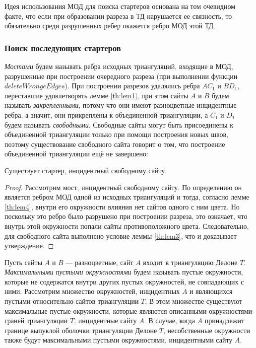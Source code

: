 \documentclass[12pt]{article}
\begin{document}
Идея использования МОД для поиска стартеров основана на том очевидном факте, что если при образовании разреза в ТД нарушается ее связность, то обязательно среди разрушенных ребер окажется ребро МОД этой ТД.

\subsubsection{Поиск последующих стартеров}
{\itshape Мостами} будем называть ребра исходных триангуляций,
входящие в МОД, разрушенные при построении очередного разреза (при выполнении функции $deleteWrongeEdges$).
При построении разрезов удалялись ребра $AC_1$ и $BD_1$, переставшие удовлетворять лемме \ref{th:lem1},
при этом сайты $A$ и $B$ будем называть {\it закрепленными}, потому что они имеют разноцветные инцидентные ребра, а значит, они прикреплены к объединенной триангуляции, а $C_1$ и $D_1$ будем называть {\it свободными}.
Свободные сайты могут быть присоединены к объединенной триангуляции только при помощи построения новых швов,
поэтому существование свободного сайта говорит о том, что построение объединенной триангуляции ещё не завершено:

\begin{lemma}
\label{th:lem6}
Существует стартер, инцидентный свободному сайту.
\end{lemma}

\begin{proof}
Рассмотрим мост, инцидентный свободному сайту.
По определению он является ребром МОД одной из исходных триангуляций и тогда, согласно лемме \ref{th:lem4}, внутри его окружности влияния нет сайтов одного с ним цвета. Но поскольку это ребро было разрушено при построении разреза, это означает, что внутрь этой окружности попали сайты противоположного цвета. Следовательно, для свободного сайта выполнено условие леммы \ref{th:lem3}, что и доказывает утверждение.
\end{proof}

Пусть сайты $A$ и $B$ --- разноцветные, сайт $A$ входит в триангуляцию Делоне $T$.
{\itshape Максимальными пустыми окружностями} будем называть пустые окружности,
которые не содержатся внутри других пустых окружностей, не совпадающих с ними.
Рассмотрим множество окружностей, инцидентных $A$ и являющихся пустыми относительно сайтов триангуляции $T$.
В этом множестве существуют максимальные пустые окружности, которые являются описанными окружностями граней триангуляции $T$,
инцидентные сайту $A$. 
В случае, когда $A$ принадлежит границе выпуклой оболочки триангуляции Делоне $T$,
несобственные окружности также будут максимальными пустыми окружностями, инцидентными сайту $A$.
\end{document}
